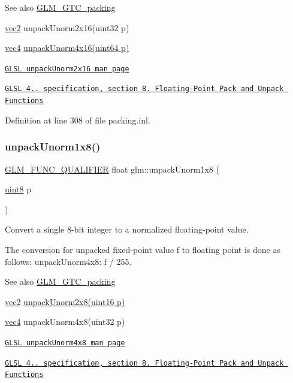 \begin{DoxySeeAlso}{See also}
\hyperlink{group__gtc__packing}{G\+L\+M\+\_\+\+G\+T\+C\+\_\+packing} 

\hyperlink{group__core__types_gaa1618f51db67eaa145db101d8c8431d8}{vec2} unpack\+Unorm2x16(uint32 p) 

\hyperlink{group__core__types_ga5881b1b022d7fd1b7218f5916532dd02}{vec4} \hyperlink{group__gtc__packing_gafb2b502bc406031a5618ce930139a9e3}{unpack\+Unorm4x16(uint64 p)} 

\href{http://www.opengl.org/sdk/docs/manglsl/xhtml/unpackUnorm2x16.xml}{\tt G\+L\+SL unpack\+Unorm2x16 man page} 

\href{http://www.opengl.org/registry/doc/GLSLangSpec.4.20.8.pdf}{\tt G\+L\+SL 4.. specification, section 8. Floating-\/\+Point Pack and Unpack Functions} 
\end{DoxySeeAlso}


Definition at line 308 of file packing.\+inl.

\mbox{\label{group__gtc__packing_ga32f3f2642df2ea87449d59fb614a8305}} 
\subsubsection{\texorpdfstring{unpack\+Unorm1x8()}{unpackUnorm1x8()}}
{\footnotesize\ttfamily \hyperlink{setup_8hpp_a33fdea6f91c5f834105f7415e2a64407}{G\+L\+M\+\_\+\+F\+U\+N\+C\+\_\+\+Q\+U\+A\+L\+I\+F\+I\+ER} float glm\+::unpack\+Unorm1x8 (\begin{DoxyParamCaption}\item[{\hyperlink{group__gtc__type__precision_ga1a7dcd8aac97cc8020817c94049deff2}{uint8}}]{p }\end{DoxyParamCaption})}

Convert a single 8-\/bit integer to a normalized floating-\/point value.

The conversion for unpacked fixed-\/point value f to floating point is done as follows\+: unpack\+Unorm4x8\+: f / 255.

\begin{DoxySeeAlso}{See also}
\hyperlink{group__gtc__packing}{G\+L\+M\+\_\+\+G\+T\+C\+\_\+packing} 

\hyperlink{group__core__types_gaa1618f51db67eaa145db101d8c8431d8}{vec2} \hyperlink{group__gtc__packing_ga96ce0c24339ee676e28a027fffd1edf6}{unpack\+Unorm2x8(uint16 p)} 

\hyperlink{group__core__types_ga5881b1b022d7fd1b7218f5916532dd02}{vec4} unpack\+Unorm4x8(uint32 p) 

\href{http://www.opengl.org/sdk/docs/manglsl/xhtml/unpackUnorm4x8.xml}{\tt G\+L\+SL unpack\+Unorm4x8 man page} 

\href{http://www.opengl.org/registry/doc/GLSLangSpec.4.20.8.pdf}{\tt G\+L\+SL 4.. specification, section 8. Floating-\/\+Point Pack and Unpack Functions} 
\end{DoxySeeAlso}


